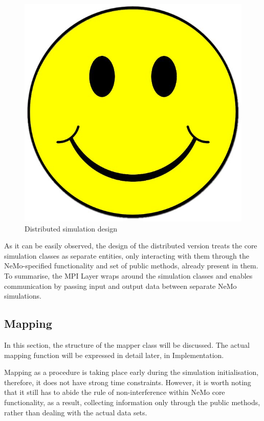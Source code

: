 \begin{figure}[h]
\begin{center}
\includegraphics[scale = 0.1]{images/placeholder.jpg}
\end{center}
\caption{Distributed simulation design}
\end{figure}

As it can be easily observed, the design of the distributed version treats the core simulation classes as separate entities, only interacting with them through the NeMo-specified functionality and set of public methods, already present in them. To summarise, the MPI Layer wraps around the simulation classes and enables communication by passing input and output data between separate NeMo simulations.

\subsection{Mapping}

In this section, the structure of the mapper class will be discussed. The actual mapping function will be expressed in detail later, in Implementation.

Mapping as a procedure is taking place early during the simulation initialisation, therefore, it does not have strong time constraints. However, it is worth noting that it still has to abide the rule of non-interference within NeMo core functionality, as a result, collecting information only through the public methods, rather than dealing with the actual data sets.

